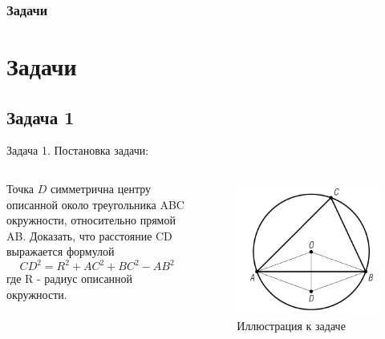 \documentclass{beamer}
\newcommand\frametitleSpec[1]{%
\frametitle{#1}
\section{#1}%
}
\begin{document}
\begin{frame}
   \frametitleSpec{Задачи}
   \subsection{Задача 1}
   \begin{block}{Задача 1. Постановка задачи:}
      \begin{columns}
         \begin{column}{0.5\textwidth}
            Точка \(D\) симметрична центру описанной около треугольника ABC окружности, относительно прямой AB.
            Доказать, что расстояние CD выражается формулой
            \begin{equation}
               CD^2 = R^2 +AC^2 + BC^2 - AB^2
               \label{t1:f1}
            \end{equation}
            где R - радиус описанной окружности.
         \end{column}
         \begin{column}{0.5\textwidth}
            \begin{figure}[h]
               \centering
               \includegraphics[width=1\textwidth]{images/task1.png}
               \caption{Иллюстрация к задаче}
               \label{t1:im}
            \end{figure}
         \end{column}
      \end{columns}
   \end{block}
\end{frame}
\end{document}
